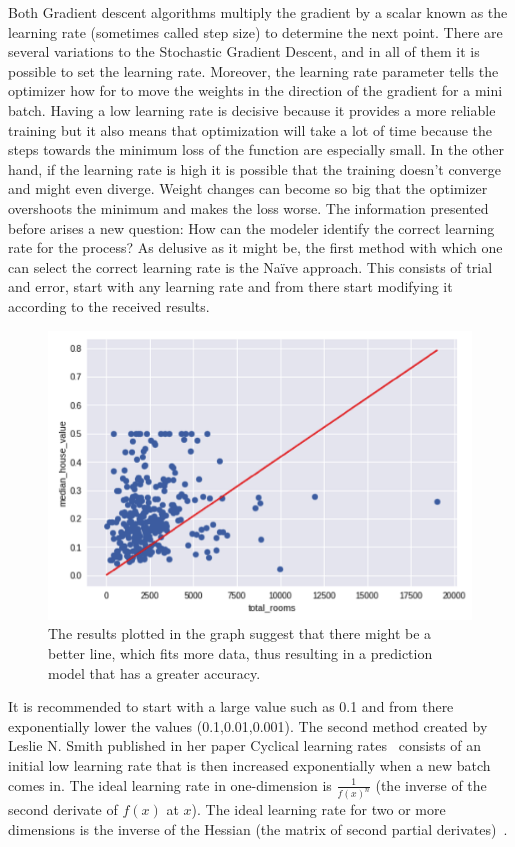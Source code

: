 Both Gradient descent algorithms multiply the gradient by a scalar known as the learning rate (sometimes called step size) to determine the next point.  There are several variations to the Stochastic Gradient Descent, and in all of them it is possible to set the learning rate.  Moreover, the learning rate parameter tells the optimizer how for to move the weights in the direction of the gradient for a mini batch. Having a low learning rate is decisive because it provides a more reliable training but it also means that optimization will take a lot of time because the steps towards the minimum loss of the function are especially small. In the other hand, if the learning rate is high it is possible that the training doesn’t converge and might even diverge.  Weight changes can become so big that the optimizer overshoots the minimum and makes the loss worse. The information presented before arises a new question: How can the modeler identify the correct learning rate for the process? 
As delusive as it might be, the first method with which one can select the correct learning rate is the Naïve approach. This consists of trial and error, start with any learning rate and from there start modifying it according to the received results. 

\begin{figure}[htbp]
  \centering
  \includegraphics[width=\textwidth]{images/linearGraph}
  \caption{ The results plotted in the graph suggest that there might be a better line, which fits more data, thus resulting in a prediction model that has a greater accuracy.}
  \label{fig:linearGraph}
\end{figure}


It is recommended to start with a large value such as 0.1 and from there exponentially lower the values (0.1,0.01,0.001).
The second method created by Leslie N. Smith published in her paper Cyclical learning rates~\cite{leslie15} consists of an initial low learning rate that is then increased exponentially when a new batch comes in.
The ideal learning rate in one-dimension is $\frac{1}{f(x)^n}$ (the inverse of the second derivate of 
$f(x)$ at $x$). The ideal learning rate for two or more dimensions is the inverse of the Hessian (the 
matrix of second partial derivates)~\cite{leslie15}.


